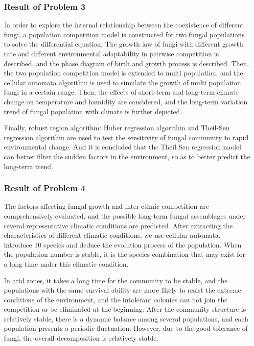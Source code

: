 \documentclass{mcmthesis}
\begin{document}
\subsubsection{Result of Problem 3}

In order to explore the internal relationship between the coexistence of different fungi, a population competition model is constructed for two fungal populations to solve the differential equation, The growth law of fungi with different growth rate and different environmental adaptability in pairwise competition is described, and the phase diagram of birth and growth process is described. Then, the two population competition model is extended to multi population, and the cellular automata algorithm is used to simulate the growth of multi population fungi in a certain range. Then, the effects of short-term and long-term climate change on temperature and humidity are considered, and the long-term variation trend of fungal population with climate is further depicted.

Finally, robust region algorithm: Huber regression algorithm and Theil-Sen regression algorithm are used to test the sensitivity of fungal community to rapid environmental change. And it is concluded that the Theil Sen regression model can better filter the sudden factors in the environment, so as to better predict the long-term trend.

\subsubsection{Result of Problem 4}

The factors affecting fungal growth and inter ethnic competition are comprehensively evaluated, and the possible long-term fungal assemblages under several representative climatic conditions are predicted. After extracting the characteristics of different climatic conditions, we use cellular automata, introduce 10 species and deduce the evolution process of the population. When the population number is stable, it is the species combination that may exist for a long time under this climatic condition.

In arid zones, it takes a long time for the community to be stable, and the populations with the same survival ability are more likely to resist the extreme conditions of the environment, and the intolerant colonies can not join the competition or be eliminated at the beginning. After the community structure is relatively stable, there is a dynamic balance among several populations, and each population presents a periodic fluctuation. However, due to the good tolerance of fungi, the overall decomposition is relatively stable.
\end{document}
